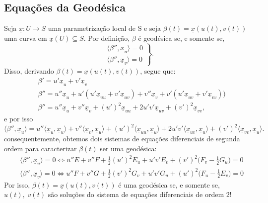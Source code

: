 \documentclass[../differential_geometry.tex]{subfiles}
\begin{document}
\subsection{Equações da Geodésica}
Seja \(\underline{x}:U\rightarrow S\) uma parametrização local de S e seja \(\beta (t) = \underline{x}(u(t), v(t))\) uma curva em \(\underline{x}(U)\subseteq S\). Por definição, \(\beta \) é geodésica se, e somente se,
\[
	\left.\begin{array}{ll}
		\langle \beta '', \underline{x}_{u} \rangle=0 \\
		\langle \beta '', \underline{x}_{v} \rangle=0
	\end{array}\right\}.
\]
Disso, derivando \(\beta (t) = \underline{x}(u(t), v(t))\), segue que:
\begin{align*}
	 & \beta ' = u'\underline{x}_{u}+v'\underline{x}_{v}                                                                                                      \\
	 & \beta ''=u''\underline{x}_{u}+u'(u'\underline{x}_{uu} + v'\underline{x}_{uv}) + v''\underline{x}_{v} +v'(u'\underline{x}_{uv} + v'\underline{x}_{vv})) \\
	 & \beta ''=u''\underline{x}_{u} + v''\underline{x}_{v} + (u')^{2}\underline{x}_{uu} + 2u'v'\underline{x}_{uv} + (v')^{2}\underline{x}_{vv},
\end{align*}
e por isso
\[
	\langle \beta '', \underline{x}_{u} \rangle = u''\langle \underline{x}_{u}, \underline{x}_{u} \rangle + v''\langle \underline{x}_{v}, \underline{x}_{u} \rangle+(u')^{2}\langle \underline{x}_{uu}, \underline{x}_{u} \rangle + 2u'v'\langle \underline{x}_{uv}, \underline{x}_{u} \rangle + (v')^{2}\langle \underline{x}_{vv}, \underline{x}_{u} \rangle.
\]
consequentemente, obtemos dois sistemas de equações diferenciais de segunda ordem para caracterizar \(\beta (t)\) ser uma geodésica:
\begin{align*}
	 & \langle \beta '', \underline{x}_{u} \rangle = 0 \Longleftrightarrow \boxed{u''E + v''F + \frac{1}{2}(u')^{2}E_{u} + u'v'E_{v}+(v')^{2}\biggl(F_{v}-\frac{1}{2}G_{u}\biggr)=0} \\
	 & \langle \beta '', \underline{x}_{v} \rangle = 0 \Longleftrightarrow \boxed{u''F + v''G + \frac{1}{2}(v')^{2}G_{v} + u'v'G_{u}+(u')^{2}\biggl(F_{u}-\frac{1}{2}E_{v}\biggr)=0}
\end{align*}
Por isso, \(\beta (t)=\underline{x}(u(t), v(t))\) é uma geodésica se, e somente se, \(u(t),\; v(t)\) são soluções do sistema de equações diferenciais de ordem 2!
\end{document}
